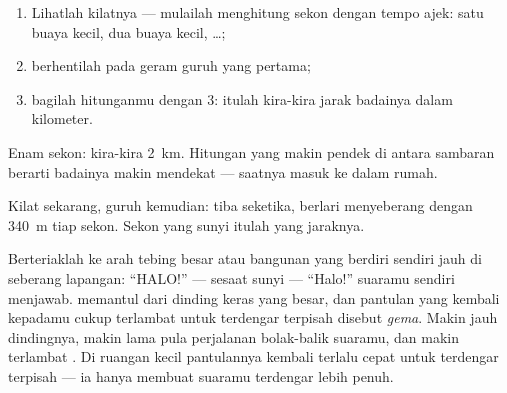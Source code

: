 \begin{method}\label{met:g4:how-sound-travels:storm}
\begin{enumerate}
  \item Lihatlah kilatnya --- mulailah menghitung sekon dengan tempo
        ajek: satu buaya kecil, dua buaya kecil, \dots;
  \item berhentilah pada geram guruh yang pertama;
  \item bagilah hitunganmu dengan $3$: itulah kira-kira jarak badainya
        dalam kilometer.
\end{enumerate}
Enam sekon: kira-kira \qty{2}{km}. Hitungan yang makin pendek di
antara sambaran berarti badainya makin mendekat --- saatnya masuk ke
dalam rumah.
\end{method}

\begin{omfigure}

{\small Kilat sekarang, guruh kemudian:  tiba seketika, 
berlari menyeberang dengan \qty{340}{m} tiap sekon. Sekon yang sunyi
itulah yang  jaraknya.}
\end{omfigure}

\begin{example}[Gema]\label{ex:g4:how-sound-travels:echo}
Berteriaklah ke arah tebing besar atau bangunan yang berdiri sendiri
jauh di seberang lapangan: ``HALO!'' --- sesaat sunyi --- ``Halo!''
suaramu sendiri menjawab.  memantul dari dinding keras yang
besar, dan  pantulan yang kembali kepadamu cukup terlambat untuk
terdengar terpisah disebut \emph{gema}. Makin jauh
dindingnya, makin lama pula perjalanan bolak-balik suaramu, dan makin
terlambat . Di ruangan kecil pantulannya kembali terlalu cepat untuk
terdengar terpisah --- ia hanya membuat suaramu terdengar lebih penuh.
\end{example}

